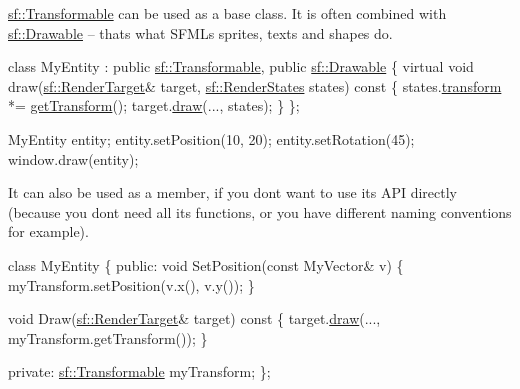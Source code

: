 \hyperlink{classsf_1_1Transformable}{sf\+::\+Transformable} can be used as a base class. It is often combined with \hyperlink{classsf_1_1Drawable}{sf\+::\+Drawable} -- that\textquotesingle{}s what S\+F\+ML\textquotesingle{}s sprites, texts and shapes do. 
\begin{DoxyCode}
\textcolor{keyword}{class }MyEntity : \textcolor{keyword}{public} \hyperlink{classsf_1_1Transformable}{sf::Transformable}, \textcolor{keyword}{public} \hyperlink{classsf_1_1Drawable}{sf::Drawable}
\{
    \textcolor{keyword}{virtual} \textcolor{keywordtype}{void} draw(\hyperlink{classsf_1_1RenderTarget}{sf::RenderTarget}& target, \hyperlink{classsf_1_1RenderStates}{sf::RenderStates} states)\textcolor{keyword}{
       const}
\textcolor{keyword}{    }\{
        states.\hyperlink{classsf_1_1RenderStates_a1f737981a0f2f0d4bb8dac866a8d1149}{transform} *= \hyperlink{classsf_1_1Transformable_a7f7c3f0bab3f162b13613904fbdbb9ad}{getTransform}();
        target.\hyperlink{classsf_1_1RenderTarget_a12417a3bcc245c41d957b29583556f39}{draw}(..., states);
    \}
\};

MyEntity entity;
entity.setPosition(10, 20);
entity.setRotation(45);
window.draw(entity);
\end{DoxyCode}


It can also be used as a member, if you don\textquotesingle{}t want to use its A\+PI directly (because you don\textquotesingle{}t need all its functions, or you have different naming conventions for example). 
\begin{DoxyCode}
\textcolor{keyword}{class }MyEntity
\{
\textcolor{keyword}{public}:
    \textcolor{keywordtype}{void} SetPosition(\textcolor{keyword}{const} MyVector& v)
    \{
        myTransform.setPosition(v.x(), v.y());
    \}

    \textcolor{keywordtype}{void} Draw(\hyperlink{classsf_1_1RenderTarget}{sf::RenderTarget}& target)\textcolor{keyword}{ const}
\textcolor{keyword}{    }\{
        target.\hyperlink{classsf_1_1RenderTarget_a12417a3bcc245c41d957b29583556f39}{draw}(..., myTransform.getTransform());
    \}

\textcolor{keyword}{private}:
    \hyperlink{classsf_1_1Transformable}{sf::Transformable} myTransform;
\};
\end{DoxyCode}


